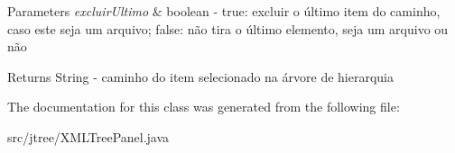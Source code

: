 \begin{DoxyParams}{Parameters}
{\em excluir\+Ultimo} & boolean -\/ true\+: excluir o último item do caminho, caso este seja um arquivo; false\+: não tira o último elemento, seja um arquivo ou não \\
\hline
\end{DoxyParams}
\begin{DoxyReturn}{Returns}
String -\/ caminho do item selecionado na árvore de hierarquia 
\end{DoxyReturn}


The documentation for this class was generated from the following file\+:\begin{DoxyCompactItemize}
\item 
src/jtree/X\+M\+L\+Tree\+Panel.\+java\end{DoxyCompactItemize}
